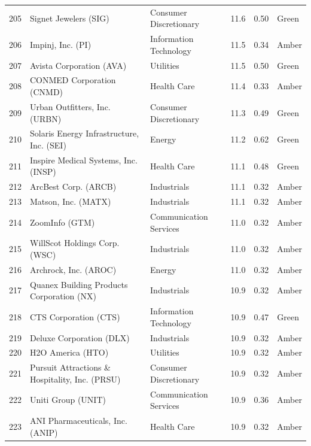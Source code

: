 \documentclass[11pt,a4paper]{article}
\begin{document}
{\begin{longtable}{r p{4.6cm} p{3cm} r r l}
205 & Signet Jewelers (SIG) & Consumer Discretionary & 11.6 & 0.50 & \cellcolor[HTML]{C6EFCE}Green \\
206 & Impinj, Inc. (PI) & Information Technology & 11.5 & 0.34 & \cellcolor[HTML]{FFEB9C}Amber \\
207 & Avista Corporation (AVA) & Utilities & 11.5 & 0.50 & \cellcolor[HTML]{C6EFCE}Green \\
208 & CONMED Corporation (CNMD) & Health Care & 11.4 & 0.33 & \cellcolor[HTML]{FFEB9C}Amber \\
209 & Urban Outfitters, Inc. (URBN) & Consumer Discretionary & 11.3 & 0.49 & \cellcolor[HTML]{C6EFCE}Green \\
210 & Solaris Energy Infrastructure, Inc. (SEI) & Energy & 11.2 & 0.62 & \cellcolor[HTML]{C6EFCE}Green \\
211 & Inspire Medical Systems, Inc. (INSP) & Health Care & 11.1 & 0.48 & \cellcolor[HTML]{C6EFCE}Green \\
212 & ArcBest Corp. (ARCB) & Industrials & 11.1 & 0.32 & \cellcolor[HTML]{FFEB9C}Amber \\
213 & Matson, Inc. (MATX) & Industrials & 11.1 & 0.32 & \cellcolor[HTML]{FFEB9C}Amber \\
214 & ZoomInfo (GTM) & Communication Services & 11.0 & 0.32 & \cellcolor[HTML]{FFEB9C}Amber \\
215 & WillScot Holdings Corp. (WSC) & Industrials & 11.0 & 0.32 & \cellcolor[HTML]{FFEB9C}Amber \\
216 & Archrock, Inc. (AROC) & Energy & 11.0 & 0.32 & \cellcolor[HTML]{FFEB9C}Amber \\
217 & Quanex Building Products Corporation (NX) & Industrials & 10.9 & 0.32 & \cellcolor[HTML]{FFEB9C}Amber \\
218 & CTS Corporation (CTS) & Information Technology & 10.9 & 0.47 & \cellcolor[HTML]{C6EFCE}Green \\
219 & Deluxe Corporation (DLX) & Industrials & 10.9 & 0.32 & \cellcolor[HTML]{FFEB9C}Amber \\
220 & H2O America (HTO) & Utilities & 10.9 & 0.32 & \cellcolor[HTML]{FFEB9C}Amber \\
221 & Pursuit Attractions \& Hospitality, Inc. (PRSU) & Consumer Discretionary & 10.9 & 0.32 & \cellcolor[HTML]{FFEB9C}Amber \\
222 & Uniti Group (UNIT) & Communication Services & 10.9 & 0.36 & \cellcolor[HTML]{FFEB9C}Amber \\
223 & ANI Pharmaceuticals, Inc. (ANIP) & Health Care & 10.9 & 0.32 & \cellcolor[HTML]{FFEB9C}Amber \\

\end{longtable}}
\end{document}
